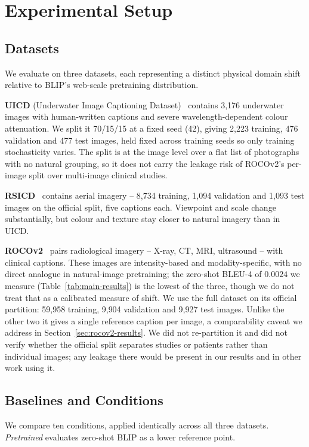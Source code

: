 \documentclass[journal]{IEEEtran}
\begin{document}
\section{Experimental Setup}
\label{sec:setup}

\subsection{Datasets}
\label{sec:datasets}
We evaluate on three datasets, each representing a distinct
physical domain shift relative to BLIP's web-scale pretraining
distribution.

\textbf{UICD} (Underwater Image Captioning Dataset)~\cite{uicd}
contains 3{,}176 underwater images with human-written captions and
severe wavelength-dependent colour attenuation. We split it 70/15/15
at a fixed seed (42), giving 2{,}223 training, 476 validation and 477
test images, held fixed across training seeds so only training
stochasticity varies. The split is at the image level over a flat list
of photographs with no natural grouping, so it does not carry the
leakage risk of ROCOv2's per-image split over multi-image clinical
studies.

\textbf{RSICD}~\cite{lu2018rsicd} contains aerial imagery --
8{,}734 training, 1{,}094 validation and 1{,}093 test images on the
official split, five captions each. Viewpoint and scale change
substantially, but colour and texture stay closer to natural imagery
than in UICD.

\textbf{ROCOv2}~\cite{ruckert2024rocov2} pairs
radiological imagery -- X-ray, CT, MRI, ultrasound -- with clinical
captions. These images are intensity-based and modality-specific, with
no direct analogue in natural-image pretraining; the zero-shot BLEU-4
of $0.0024$ we measure (Table~\ref{tab:main-results}) is the lowest
of the three, though we do not treat that as a calibrated measure of shift. We use the full dataset on its official partition: 59{,}958 training, 9{,}904 validation and 9{,}927 test images. Unlike the other two it gives a single reference caption per image, a comparability caveat we address in Section~\ref{sec:rocov2-results}. We did not re-partition it and did not verify whether the official split separates studies or patients rather than individual images; any leakage there would be present in our results and in other work using it.

\subsection{Baselines and Conditions}
We compare ten conditions, applied identically across all three
datasets. \emph{Pretrained} evaluates zero-shot BLIP as a lower
reference point.
\end{document}
